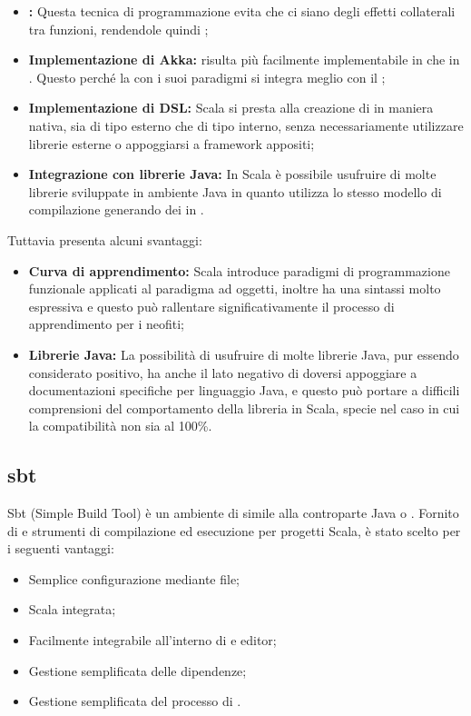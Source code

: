 \documentclass{scalatekids-article}
\begin{document}
\begin{itemize}
\item\textbf{:} Questa tecnica di
  programmazione evita che ci siano degli effetti collaterali tra funzioni,
  rendendole quindi ;
\item\textbf{Implementazione di Akka:}  risulta più
  facilmente implementabile in  che in . Questo perché
  la  con i suoi paradigmi si integra meglio
  con il ;
\item\textbf{Implementazione di DSL:} Scala si presta alla creazione di 
  in maniera nativa, sia di tipo esterno che di tipo interno, senza necessariamente
  utilizzare librerie esterne o appoggiarsi a framework appositi;
\item\textbf{Integrazione con librerie Java:} In Scala è possibile usufruire di molte
  librerie sviluppate in ambiente Java in quanto utilizza lo stesso modello di compilazione
  generando dei  in .
\end{itemize}

Tuttavia presenta alcuni svantaggi:

\begin{itemize}
\item\textbf{Curva di apprendimento:} Scala introduce paradigmi di programmazione funzionale
  applicati al paradigma ad oggetti, inoltre ha una sintassi molto espressiva e questo può
  rallentare significativamente il processo di apprendimento per i neofiti;
\item\textbf{Librerie Java:} La possibilità di usufruire di molte librerie Java, pur essendo
  considerato positivo, ha anche il lato negativo di doversi appoggiare a documentazioni specifiche
  per linguaggio Java, e questo può portare a difficili comprensioni del comportamento della libreria
  in Scala, specie nel caso in cui la compatibilità non sia al 100\%.
\end{itemize}

\subsection{sbt}

Sbt (Simple Build Tool) è un ambiente di  simile alla controparte Java  o
. Fornito di  e strumenti di compilazione ed
esecuzione per progetti Scala, è stato scelto per i seguenti vantaggi:
\begin{itemize}
\item Semplice configurazione mediante file;
\item {} Scala integrata;
\item Facilmente integrabile all'interno di  e editor;
\item Gestione semplificata delle dipendenze;
\item Gestione semplificata del processo di .
\end{itemize}
\end{document}
